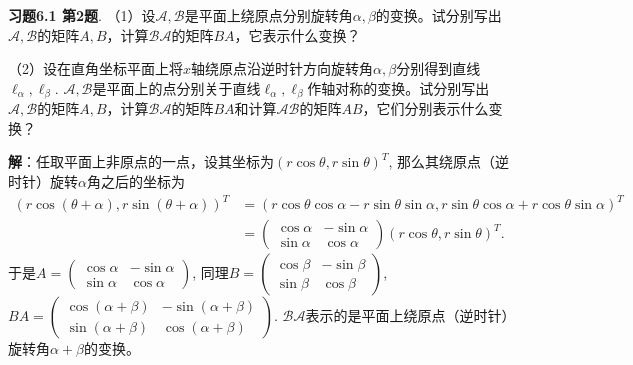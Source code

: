 
\renewcommand{\newpageorvspace}{\vspace{2em}}

\date{2022-3-11  第一次习题课}



\maketitle

{\bf 习题6.1 第2题}. （1）设$\mathscr{A, B}$是平面上绕原点分别旋转角$\alpha, \beta$的变换。试分别写出$\mathscr{A, B}$的矩阵$A,B$，计算$\mathscr{BA}$的矩阵$BA$，它表示什么变换？

（2）设在直角坐标平面上将$x$轴绕原点沿逆时针方向旋转角$\alpha, \beta$分别得到直线$\ell_{\alpha}, \ell_{\beta}$. $\mathscr{A, B}$是平面上的点分别关于直线$\ell_{\alpha}, \ell_{\beta}$作轴对称的变换。试分别写出$\mathscr{A, B}$的矩阵$A,B$，计算$\mathscr{BA}$的矩阵$BA$和计算$\mathscr{AB}$的矩阵$AB$，它们分别表示什么变换？

{\bf 解}：任取平面上非原点的一点，设其坐标为$(r\cos\theta, r\sin\theta)^T$, 那么其绕原点（逆时针）旋转$\alpha$角之后的坐标为
\begin{align*}
(r\cos(\theta+\alpha), r\sin(\theta+\alpha))^T & = (r\cos\theta\cos\alpha - r\sin\theta\sin\alpha, r\sin\theta\cos\alpha + r\cos\theta\sin\alpha)^T \\
& = \begin{pmatrix} \cos\alpha & -\sin\alpha \\ \sin\alpha & \cos\alpha \end{pmatrix} (r\cos\theta, r\sin\theta)^T.
\end{align*}
于是$A = \begin{pmatrix} \cos\alpha & -\sin\alpha \\ \sin\alpha & \cos\alpha \end{pmatrix}$, 同理$B = \begin{pmatrix} \cos\beta & -\sin\beta \\ \sin\beta & \cos\beta \end{pmatrix}$, $BA = \begin{pmatrix} \cos(\alpha+\beta) & -\sin(\alpha+\beta) \\ \sin(\alpha+\beta) & \cos(\alpha+\beta) \end{pmatrix}$. $\mathscr{BA}$表示的是平面上绕原点（逆时针）旋转角$\alpha+\beta$的变换。

